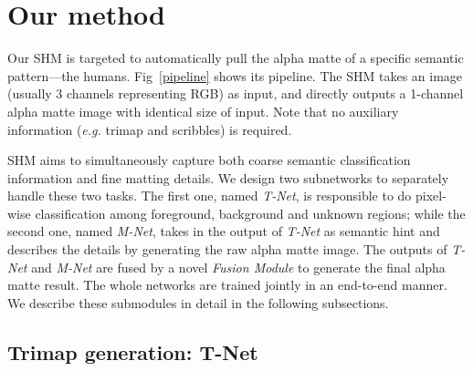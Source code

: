 \begin{comment}

We would like to highlight the following features of our human matting datasets:
1) Our dataset is the first large scale human matting dataset with high quality alpha mattes, which also ensure the semantic integrity and unicity; 
2) The dataset has more than 35k unique human instances, which not only is large in number, but also has a large diversity including different age, poses, \emph{etc};
3) The compositional images in this dataset have various complex backgrounds, which makes them close to natural images. 
Therefore, our dataset is more suitable for the human matting task than others.

\end{comment}







\section{Our method}


Our SHM is targeted to automatically pull the alpha matte of a specific semantic pattern---the humans.
Fig~\ref{pipeline} shows its pipeline.
The SHM takes an image (usually 3 channels representing RGB) as input, and directly outputs a 1-channel alpha matte image with identical size of input.
Note that no auxiliary information (\emph{e.g.} trimap and scribbles) is required.

SHM aims to simultaneously capture both coarse semantic classification information and fine matting details.
We design two subnetworks to separately handle these two tasks.
The first one, named \emph{T-Net}, is responsible to do pixel-wise classification among foreground, background and unknown regions; while the second one, named \emph{M-Net}, takes in the output of \emph{T-Net} as semantic hint and describes the details by generating the raw alpha matte image.
The outputs of \emph{T-Net} and \emph{M-Net} are fused by a novel \emph{Fusion Module} to generate the final alpha matte result.
The whole networks are trained jointly in an end-to-end manner.
We describe these submodules in detail in the following subsections.

\subsection{Trimap generation: T-Net}

